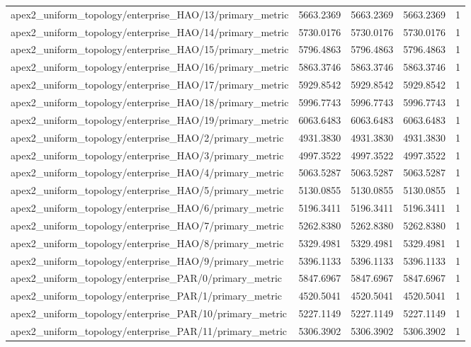 \begin{table}[h]
\begin{tabular}{lrrrr}
apex2_uniform_topology/enterprise_HAO/13/primary_metric & 5663.2369 & 5663.2369 & 5663.2369 & 1 \\
apex2_uniform_topology/enterprise_HAO/14/primary_metric & 5730.0176 & 5730.0176 & 5730.0176 & 1 \\
apex2_uniform_topology/enterprise_HAO/15/primary_metric & 5796.4863 & 5796.4863 & 5796.4863 & 1 \\
apex2_uniform_topology/enterprise_HAO/16/primary_metric & 5863.3746 & 5863.3746 & 5863.3746 & 1 \\
apex2_uniform_topology/enterprise_HAO/17/primary_metric & 5929.8542 & 5929.8542 & 5929.8542 & 1 \\
apex2_uniform_topology/enterprise_HAO/18/primary_metric & 5996.7743 & 5996.7743 & 5996.7743 & 1 \\
apex2_uniform_topology/enterprise_HAO/19/primary_metric & 6063.6483 & 6063.6483 & 6063.6483 & 1 \\
apex2_uniform_topology/enterprise_HAO/2/primary_metric & 4931.3830 & 4931.3830 & 4931.3830 & 1 \\
apex2_uniform_topology/enterprise_HAO/3/primary_metric & 4997.3522 & 4997.3522 & 4997.3522 & 1 \\
apex2_uniform_topology/enterprise_HAO/4/primary_metric & 5063.5287 & 5063.5287 & 5063.5287 & 1 \\
apex2_uniform_topology/enterprise_HAO/5/primary_metric & 5130.0855 & 5130.0855 & 5130.0855 & 1 \\
apex2_uniform_topology/enterprise_HAO/6/primary_metric & 5196.3411 & 5196.3411 & 5196.3411 & 1 \\
apex2_uniform_topology/enterprise_HAO/7/primary_metric & 5262.8380 & 5262.8380 & 5262.8380 & 1 \\
apex2_uniform_topology/enterprise_HAO/8/primary_metric & 5329.4981 & 5329.4981 & 5329.4981 & 1 \\
apex2_uniform_topology/enterprise_HAO/9/primary_metric & 5396.1133 & 5396.1133 & 5396.1133 & 1 \\
apex2_uniform_topology/enterprise_PAR/0/primary_metric & 5847.6967 & 5847.6967 & 5847.6967 & 1 \\
apex2_uniform_topology/enterprise_PAR/1/primary_metric & 4520.5041 & 4520.5041 & 4520.5041 & 1 \\
apex2_uniform_topology/enterprise_PAR/10/primary_metric & 5227.1149 & 5227.1149 & 5227.1149 & 1 \\
apex2_uniform_topology/enterprise_PAR/11/primary_metric & 5306.3902 & 5306.3902 & 5306.3902 & 1 \\

\end{tabular}
\end{table}
